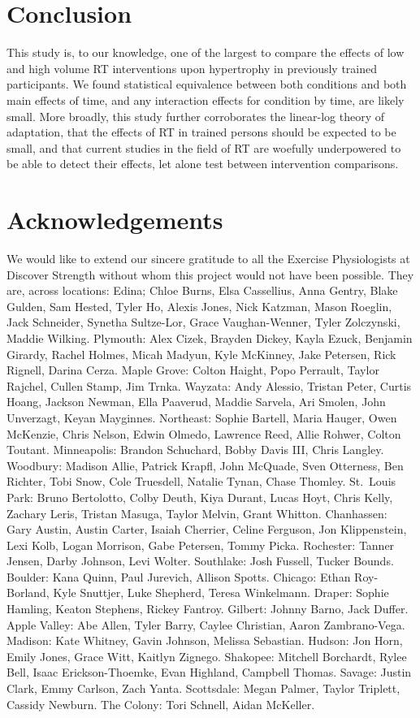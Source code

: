 \documentclass[
]{article}
\begin{document}
\section{Conclusion}\label{conclusion}

This study is, to our knowledge, one of the largest to compare the
effects of low and high volume RT interventions upon hypertrophy in
previously trained participants. We found statistical equivalence
between both conditions and both main effects of time, and any
interaction effects for condition by time, are likely small. More
broadly, this study further corroborates the linear-log theory of
adaptation, that the effects of RT in trained persons should be expected
to be small, and that current studies in the field of RT are woefully
underpowered to be able to detect their effects, let alone test between
intervention comparisons.

\section{Acknowledgements}\label{acknowledgements}

We would like to extend our sincere gratitude to all the Exercise
Physiologists at Discover Strength without whom this project would not
have been possible. They are, across locations: Edina; Chloe Burns, Elsa
Cassellius, Anna Gentry, Blake Gulden, Sam Hested, Tyler Ho, Alexis
Jones, Nick Katzman, Mason Roeglin, Jack Schneider, Synetha Sultze-Lor,
Grace Vaughan-Wenner, Tyler Zolczynski, Maddie Wilking. Plymouth: Alex
Cizek, Brayden Dickey, Kayla Ezuck, Benjamin Girardy, Rachel Holmes,
Micah Madyun, Kyle McKinney, Jake Petersen, Rick Rignell, Darina Cerza.
Maple Grove: Colton Haight, Popo Perrault, Taylor Rajchel, Cullen Stamp,
Jim Trnka. Wayzata: Andy Alessio, Tristan Peter, Curtis Hoang, Jackson
Newman, Ella Paaverud, Maddie Sarvela, Ari Smolen, John Unverzagt, Keyan
Mayginnes. Northeast: Sophie Bartell, Maria Hauger, Owen McKenzie, Chris
Nelson, Edwin Olmedo, Lawrence Reed, Allie Rohwer, Colton Toutant.
Minneapolis: Brandon Schuchard, Bobby Davis III, Chris Langley.
Woodbury: Madison Allie, Patrick Krapfl, John McQuade, Sven Otterness,
Ben Richter, Tobi Snow, Cole Truesdell, Natalie Tynan, Chase Thomley.
St.~Louis Park: Bruno Bertolotto, Colby Deuth, Kiya Durant, Lucas Hoyt,
Chris Kelly, Zachary Leris, Tristan Masuga, Taylor Melvin, Grant
Whitton. Chanhassen: Gary Austin, Austin Carter, Isaiah Cherrier, Celine
Ferguson, Jon Klippenstein, Lexi Kolb, Logan Morrison, Gabe Petersen,
Tommy Picka. Rochester: Tanner Jensen, Darby Johnson, Levi Wolter.
Southlake: Josh Fussell, Tucker Bounds. Boulder: Kana Quinn, Paul
Jurevich, Allison Spotts. Chicago: Ethan Roy-Borland, Kyle Snuttjer,
Luke Shepherd, Teresa Winkelmann. Draper: Sophie Hamling, Keaton
Stephens, Rickey Fantroy. Gilbert: Johnny Barno, Jack Duffer. Apple
Valley: Abe Allen, Tyler Barry, Caylee Christian, Aaron Zambrano-Vega.
Madison: Kate Whitney, Gavin Johnson, Melissa Sebastian. Hudson: Jon
Horn, Emily Jones, Grace Witt, Kaitlyn Zignego. Shakopee: Mitchell
Borchardt, Rylee Bell, Isaac Erickson-Thoemke, Evan Highland, Campbell
Thomas. Savage: Justin Clark, Emmy Carlson, Zach Yanta. Scottsdale:
Megan Palmer, Taylor Triplett, Cassidy Newburn. The Colony: Tori
Schnell, Aidan McKeller.
\end{document}
